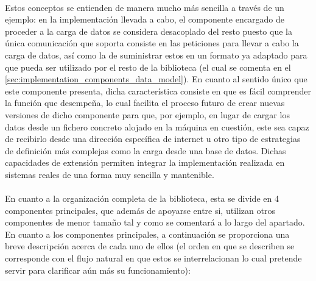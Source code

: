\documentclass{subfiles}
\begin{document}
          \paragraph{}
          Estos conceptos se entienden de manera mucho más sencilla a través de un ejemplo: en la implementación llevada a cabo, el componente encargado de proceder a la carga de datos se considera desacoplado del resto puesto que la única comunicación que soporta consiste en las peticiones para llevar a cabo la carga de datos, así como la de suministrar estos en un formato ya adaptado para que pueda ser utilizado por el resto de la biblioteca (el cual se comenta en el \cref{sec:implementation_components_data_model}). En cuanto al sentido único que este componente presenta, dicha característica consiste en que es fácil comprender la función que desempeña, lo cual facilita el proceso futuro de crear nuevas versiones de dicho componente para que, por ejemplo, en lugar de cargar los datos desde un fichero concreto alojado en la máquina en cuestión, este sea capaz de recibirlo desde una dirección específica de internet u otro tipo de estrategias de definición más complejas como la carga desde una base de datos. Dichas capacidades de extensión permiten integrar la implementación realizada en sistemas reales de una forma muy sencilla y mantenible.
          
          \paragraph{}
          En cuanto a la organización completa de la biblioteca, esta se divide en 4 componentes principales, que además de apoyarse entre si, utilizan otros componentes de menor tamaño tal y como se comentará a lo largo del apartado. En cuanto a los componentes principales, a continuación se proporciona una breve descripción acerca de cada uno de ellos (el orden en que se describen se corresponde con el flujo natural en que estos se interrelacionan lo cual pretende servir para clarificar aún más su funcionamiento):
\end{document}
